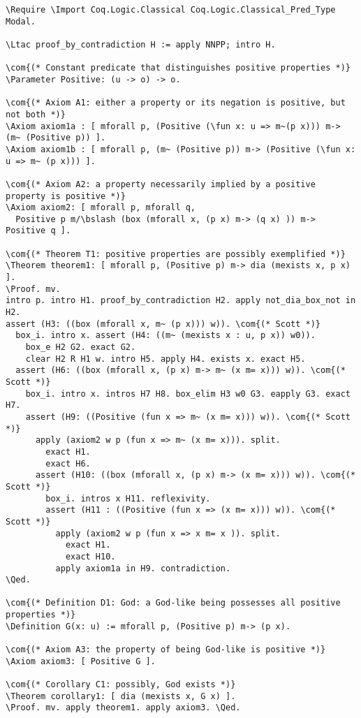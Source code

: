 \documentclass{llncs}
\newcommand{\red}[1]{\textcolor[rgb]{1,0,0}{#1}}
\newcommand{\blue}[1]{\textcolor[rgb]{0,0,1}{#1}}
\newcommand{\brown}[1]{\textcolor[rgb]{0.8,0.6,0.4}{#1}}
\newcommand{\Parameter}{\red{Parameter}}
\newcommand{\Ltac}{\red{Ltac}}
\newcommand{\Axiom}{\red{Axiom}}
\newcommand{\Theorem}{\red{Theorem}}
\newcommand{\Definition}{\red{Definition}}
\newcommand{\Require}{\blue{Require}}
\newcommand{\Import}{\blue{Import}}
\newcommand{\fun}{\blue{fun}}
\newcommand{\Proof}{\blue{Proof}}
\newcommand{\Qed}{\blue{Qed}}
\newcommand{\com}[1]{\brown{#1}}
\newcommand{\bslash}{\symbol{92}}
\begin{document}
\begin{Verbatim}[commandchars=\\\{\},fontsize=\verbsize]
\Require \Import Coq.Logic.Classical Coq.Logic.Classical_Pred_Type Modal.

\Ltac proof_by_contradiction H := apply NNPP; intro H.

\com{(* Constant predicate that distinguishes positive properties *)}
\Parameter Positive: (u -> o) -> o.

\com{(* Axiom A1: either a property or its negation is positive, but not both *)}
\Axiom axiom1a : [ mforall p, (Positive (\fun x: u => m~(p x))) m-> (m~ (Positive p)) ].
\Axiom axiom1b : [ mforall p, (m~ (Positive p)) m-> (Positive (\fun x: u => m~ (p x))) ].

\com{(* Axiom A2: a property necessarily implied by a positive property is positive *)}
\Axiom axiom2: [ mforall p, mforall q, 
  Positive p m/\bslash (box (mforall x, (p x) m-> (q x) )) m-> Positive q ].

\com{(* Theorem T1: positive properties are possibly exemplified *)}
\Theorem theorem1: [ mforall p, (Positive p) m-> dia (mexists x, p x) ].
\Proof. mv.
intro p. intro H1. proof_by_contradiction H2. apply not_dia_box_not in H2.
assert (H3: ((box (mforall x, m~ (p x))) w)). \com{(* Scott *)}
  box_i. intro x. assert (H4: ((m~ (mexists x : u, p x)) w0)).
    box_e H2 G2. exact G2.
    clear H2 R H1 w. intro H5. apply H4. exists x. exact H5.
  assert (H6: ((box (mforall x, (p x) m-> m~ (x m= x))) w)). \com{(* Scott *)}   
    box_i. intro x. intros H7 H8. box_elim H3 w0 G3. eapply G3. exact H7.
    assert (H9: ((Positive (fun x => m~ (x m= x))) w)). \com{(* Scott *)}
      apply (axiom2 w p (fun x => m~ (x m= x))). split.
        exact H1.
        exact H6.
      assert (H10: ((box (mforall x, (p x) m-> (x m= x))) w)). \com{(* Scott *)}
        box_i. intros x H11. reflexivity.
        assert (H11 : ((Positive (fun x => (x m= x))) w)). \com{(* Scott *)}
          apply (axiom2 w p (fun x => x m= x )). split.
            exact H1.
            exact H10.
          apply axiom1a in H9. contradiction.
\Qed.

\com{(* Definition D1: God: a God-like being possesses all positive properties *)}
\Definition G(x: u) := mforall p, (Positive p) m-> (p x).

\com{(* Axiom A3: the property of being God-like is positive *)}
\Axiom axiom3: [ Positive G ].

\com{(* Corollary C1: possibly, God exists *)}
\Theorem corollary1: [ dia (mexists x, G x) ]. 
\Proof. mv. apply theorem1. apply axiom3. \Qed.


\end{Verbatim}
\end{document}

